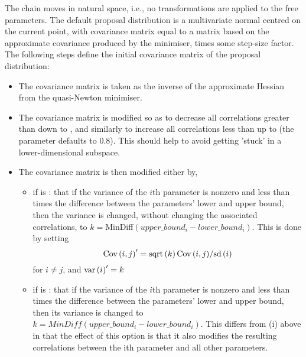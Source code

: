 The chain moves in natural space, i.e., no transformations are applied to the free parameters. The default proposal distribution is a multivariate normal centred on the current point, with covariance matrix equal to a matrix based on the approximate covariance produced by the minimiser, times some step-size factor. The following steps define the initial covariance matrix of the proposal distribution: 

\begin{itemize}
\item The covariance matrix is taken as the inverse of the approximate Hessian from the quasi-Newton minimiser.

\item The covariance matrix is modified so as to decrease all correlations greater than  down to , and similarly to increase all correlations less than   up to  (the  parameter defaults to 0.8). This should help to avoid getting 'stuck' in a lower-dimensional subspace.

\item The covariance matrix is then modified either by,

\begin{itemize}
\item if  is : that if the variance of the $i$th parameter is nonzero and less than  times the difference between the parameters' lower and upper bound, then the variance is changed, without changing the associated correlations, to $k=$MinDiff$(upper\_bound_i-lower\_bound_i)$. This is done by setting \[
{\mathop{\rm Cov}\nolimits} \left( {i,j} \right)^\prime   = {{{\mathop{\rm sqrt}\nolimits} \left( k \right){\mathop{\rm Cov}\nolimits} \left( {i,j} \right)} \mathord{\left/
{\vphantom {{{\mathop{\rm sqrt}\nolimits} \left( k \right){\mathop{\rm Cov}\nolimits} \left( {i,j} \right)} {{\mathop{\rm sd}\nolimits} \left( i \right)}}} \right.
\kern-\nulldelimiterspace} {{\mathop{\rm sd}\nolimits} \left( i \right)}}
\]
for $i \ne j$, and ${\mathop{\rm var}} \left( i \right)^\prime   = k$

\item if  is : that if the variance of the $i$th parameter is nonzero and less than  times the difference between the parameters' lower and upper bound, then its variance is changed to $k=MinDiff(upper\_bound_i-lower\_bound_i)$. This differs from (i) above in that the effect of this option is that it also modifies the resulting correlations between the ith parameter and all other parameters.
\end{itemize}


\end{itemize}
